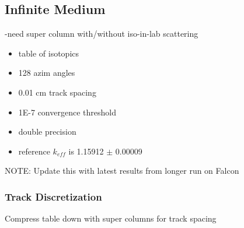 \subsection{Infinite Medium}
\label{subsec:chap4-inf-medium}

-need super column with/without iso-in-lab scattering

\begin{itemize}[noitemsep]
\item table of isotopics
\item 128 azim angles
\item 0.01 cm track spacing
\item 1E-7 convergence threshold
\item double precision
\item reference $k_{eff}$ is 1.15912 $\pm$ 0.00009
\end{itemize}

NOTE: Update this with latest results from longer run on Falcon


\subsubsection{Track Discretization}
\label{subsubsec:chap4-inf-medium-tracks}

Compress table down with super columns for track spacing

